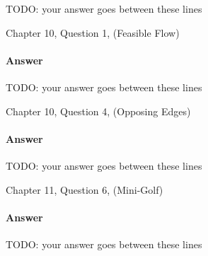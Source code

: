 \documentclass{article}
\begin{document}

TODO: your answer goes between these lines


\nextprob
{}

Chapter 10, Question 1, (Feasible Flow)

\paragraph{Answer}


TODO: your answer goes between these lines



\nextprob
{}

Chapter 10, Question 4, (Opposing Edges)

\paragraph{Answer}


TODO: your answer goes between these lines


\nextprob
{}

Chapter 11, Question 6, (Mini-Golf)

\paragraph{Answer}


TODO: your answer goes between these lines

\end{document}
